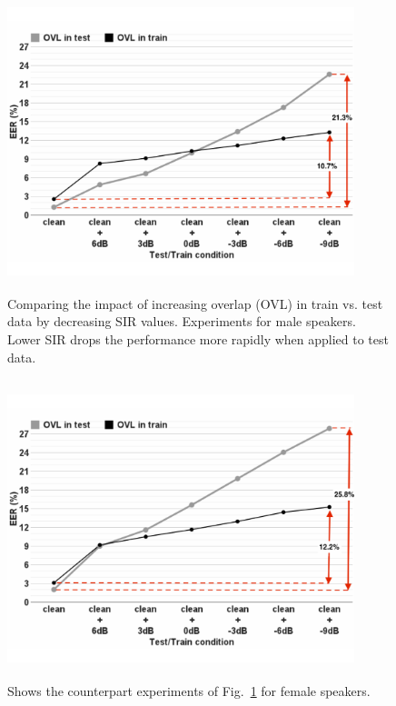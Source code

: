 \begin{figure}[h!]
	\includegraphics[height = 3.43in, width=0.9\textwidth]{figures/sidingrid_ovlintrainvstest_male_rev1}
	\caption{ Comparing the impact of increasing overlap (OVL) in train vs. test data by decreasing SIR values. Experiments for male speakers. Lower SIR drops the performance more rapidly when applied to test data.}
	\label{fig:ch3_sidingrid_ovlintrainvstest_male}
\end{figure}

\begin{figure}[h!]
	\includegraphics[height = 3.43in, width=0.9\textwidth]{figures/sidingrid_ovlintrainvstest_female_rev1}
	\caption{ Shows the counterpart experiments of Fig.~\ref{fig:ch3_sidingrid_ovlintrainvstest_male} for female speakers.}
	\label{fig:ch3_sidingrid_ovlintrainvstest_female}
\end{figure}



